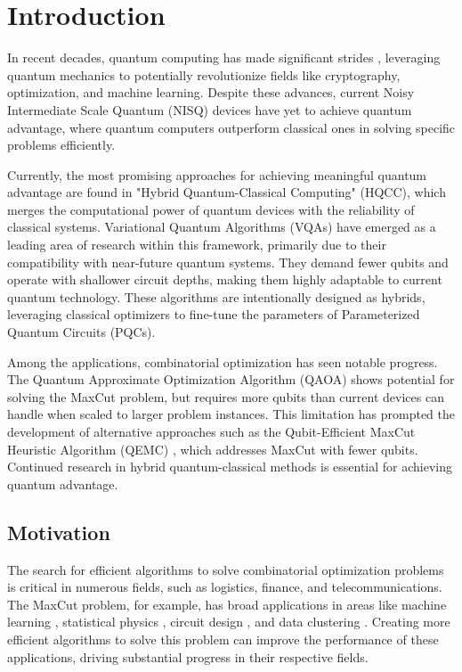 \section{Introduction}
\label{sec:intro}
In recent decades, quantum computing has made significant strides \cite{preskill2023quantum}, leveraging quantum mechanics to potentially revolutionize fields like cryptography, optimization, and machine learning. Despite these advances, current Noisy Intermediate Scale Quantum (NISQ) devices have yet to achieve quantum advantage, where quantum computers outperform classical ones in solving specific problems efficiently.

Currently, the most promising approaches for achieving meaningful quantum advantage are found in "Hybrid Quantum-Classical Computing" (HQCC), which merges the computational power of quantum devices with the reliability of classical systems. Variational Quantum Algorithms (VQAs) have emerged as a leading area of research within this framework, primarily due to their compatibility with near-future quantum systems. They demand fewer qubits and operate with shallower circuit depths, making them highly adaptable to current quantum technology. These algorithms are intentionally designed as hybrids, leveraging classical optimizers to fine-tune the parameters of Parameterized Quantum Circuits (PQCs).

Among the applications, combinatorial optimization has seen notable progress. The Quantum Approximate Optimization Algorithm (QAOA) \cite{farhi2014quantum} shows potential for solving the MaxCut problem, but requires more qubits than current devices can handle when scaled to larger problem instances. This limitation has prompted the development of alternative approaches such as the Qubit-Efficient MaxCut Heuristic Algorithm (QEMC) \cite{tenecohen2023variational}, which addresses MaxCut with fewer qubits. Continued research in hybrid quantum-classical methods is essential for achieving quantum advantage.

\subsection{Motivation}
\label{section:motivation}
The search for efficient algorithms to solve combinatorial optimization problems is critical in numerous fields, such as logistics, finance, and telecommunications. The MaxCut problem, for example, has broad applications in areas like machine learning \cite{937505}, statistical physics \cite{Barahona_Grötschel_Jünger_Reinelt_1988}, circuit design \cite{Barahona_Grötschel_Jünger_Reinelt_1988}, and data clustering \cite{10.1007/11893318_21}. Creating more efficient algorithms to solve this problem can improve the performance of these applications, driving substantial progress in their respective fields.


